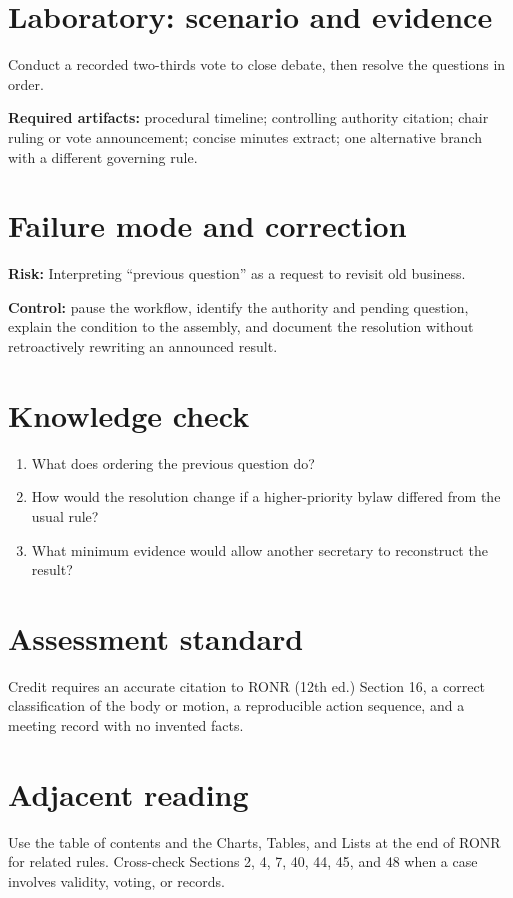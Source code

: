 \documentclass[11pt]{article}
\begin{document}
\section{Laboratory: scenario and evidence}
Conduct a recorded two-thirds vote to close debate, then resolve the questions in order.

\textbf{Required artifacts:} procedural timeline; controlling authority citation; chair ruling or vote announcement; concise minutes extract; one alternative branch with a different governing rule.

\section{Failure mode and correction}
\textbf{Risk:} Interpreting “previous question” as a request to revisit old business.

\textbf{Control:} pause the workflow, identify the authority and pending question, explain the condition to the assembly, and document the resolution without retroactively rewriting an announced result.

\section{Knowledge check}
\begin{enumerate}[leftmargin=*,itemsep=4pt]
\item What does ordering the previous question do?
\item How would the resolution change if a higher-priority bylaw differed from the usual rule?
\item What minimum evidence would allow another secretary to reconstruct the result?
\end{enumerate}

\section{Assessment standard}
Credit requires an accurate citation to RONR (12th ed.) Section 16, a correct classification of the body or motion, a reproducible action sequence, and a meeting record with no invented facts.

\section{Adjacent reading}
Use the table of contents and the Charts, Tables, and Lists at the end of RONR for related rules. Cross-check Sections 2, 4, 7, 40, 44, 45, and 48 when a case involves validity, voting, or records.
\end{document}
